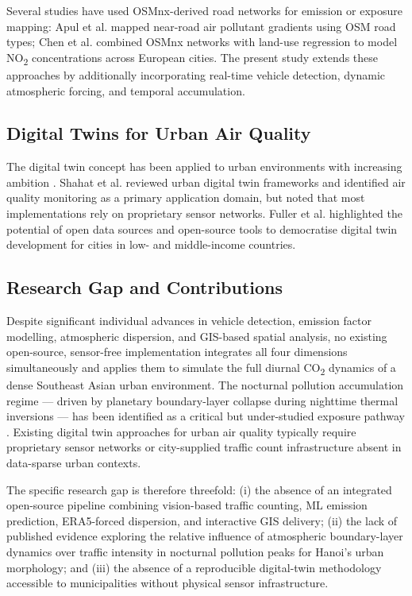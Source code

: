 \documentclass[12pt,a4paper]{article}
\begin{document}
Several studies have used OSMnx-derived road networks for emission or exposure mapping: Apul et al. \cite{Apul2018} mapped near-road air pollutant gradients using OSM road types; Chen et al. \cite{Chen2022} combined OSMnx networks with land-use regression to model NO\textsubscript{2} concentrations across European cities. The present study extends these approaches by additionally incorporating real-time vehicle detection, dynamic atmospheric forcing, and temporal accumulation.

\subsection{Digital Twins for Urban Air Quality}

The digital twin concept has been applied to urban environments with increasing ambition \cite{GrievesVickers2017,Ketzler2020}. Shahat et al. \cite{Shahat2021} reviewed urban digital twin frameworks and identified air quality monitoring as a primary application domain, but noted that most implementations rely on proprietary sensor networks. Fuller et al. \cite{Fuller2020} highlighted the potential of open data sources and open-source tools to democratise digital twin development for cities in low- and middle-income countries.

\subsection{Research Gap and Contributions}

Despite significant individual advances in vehicle detection, emission factor modelling, atmospheric dispersion, and GIS-based spatial analysis, no existing open-source, sensor-free implementation integrates all four dimensions simultaneously and applies them to simulate the full diurnal CO\textsubscript{2} dynamics of a dense Southeast Asian urban environment. The nocturnal pollution accumulation regime --- driven by planetary boundary-layer collapse during nighttime thermal inversions --- has been identified as a critical but under-studied exposure pathway \cite{Deng2023,Peng2023,He2019}. Existing digital twin approaches for urban air quality \cite{Ketzler2020,Shahat2021} typically require proprietary sensor networks or city-supplied traffic count infrastructure absent in data-sparse urban contexts.

The specific research gap is therefore threefold: (i) the absence of an integrated open-source pipeline combining vision-based traffic counting, ML emission prediction, ERA5-forced dispersion, and interactive GIS delivery; (ii) the lack of published evidence exploring the relative influence of atmospheric boundary-layer dynamics over traffic intensity in nocturnal pollution peaks for Hanoi's urban morphology; and (iii) the absence of a reproducible digital-twin methodology accessible to municipalities without physical sensor infrastructure.
\end{document}
